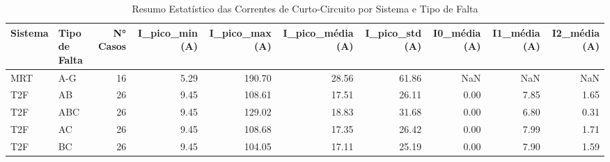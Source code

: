 \begin{table}[htbp]
\centering
\caption{Resumo Estatístico das Correntes de Curto-Circuito por Sistema e Tipo de Falta}
\label{tab:resumo_geral_cap4}
\begin{tabular}{llrrrrrrrr}
\toprule
Sistema & Tipo de Falta & N° Casos & I_pico_min (A) & I_pico_max (A) & I_pico_média (A) & I_pico_std (A) & I0_média (A) & I1_média (A) & I2_média (A) \\
\midrule
MRT & A-G & 16 & 5.29 & 190.70 & 28.56 & 61.86 & NaN & NaN & NaN \\
T2F & AB & 26 & 9.45 & 108.61 & 17.51 & 26.11 & 0.00 & 7.85 & 1.65 \\
T2F & ABC & 26 & 9.45 & 129.02 & 18.83 & 31.68 & 0.00 & 6.80 & 0.31 \\
T2F & AC & 26 & 9.45 & 108.68 & 17.35 & 26.42 & 0.00 & 7.99 & 1.71 \\
T2F & BC & 26 & 9.45 & 104.05 & 17.11 & 25.19 & 0.00 & 7.90 & 1.59 \\
\bottomrule
\end{tabular}
\end{table}
